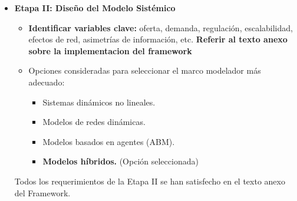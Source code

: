 \documentclass[a4paper,12pt]{article}
\begin{document}
\begin{itemize}
\begin{itemize}
\begin{itemize}
\begin{itemize}
    \item Evaluación de estrategias de riesgo: Analizar cómo el monopolio gestiona su exposición a eventos extremos (cisnes negros) y si su estructura le permite beneficiarse de ellos en vez de solo sobrevivir.
    \end{itemize}
\end{itemize}    

    \item Definir operacionalmente conceptos clave: monopolio, emergencia, voluntad centralizada, condiciones sistémicas, antifragilidad.
    \begin{itemize}
    \item \textbf{Referir al texto anexo sobre la implementacion del framework}
    \end{itemize}
    \item Estudiar modelos dinámicos relevantes: ecuaciones de Lotka-Volterra, redes complejas, sistemas autoorganizados.
    \begin{itemize}
    \item \textbf{Referir al texto anexo sobre la implementacion del framework.}
    \end{itemize}
     
    \end{itemize}
\item \textbf{Etapa II: Diseño del Modelo Sistémico} 
	\begin{itemize}
	\item \textbf{Identificar variables clave:}
	oferta, demanda, regulación, escalabilidad, efectos
de red, asimetrías de información, etc. \textbf{Referir al texto anexo sobre la implementacion del framework}
    \item Opciones consideradas para seleccionar el marco modelador más adecuado:
    \begin{itemize}
        \item Sistemas dinámicos no lineales.
        \item Modelos de redes dinámicas.
        \item Modelos basados en agentes (ABM).
        \item \textbf{Modelos híbridos.} (Opción seleccionada) 
    \end{itemize}
	\end{itemize}
Todos los requerimientos de la Etapa II se han satisfecho en el texto anexo del Framework.


\end{itemize}
\end{document}
